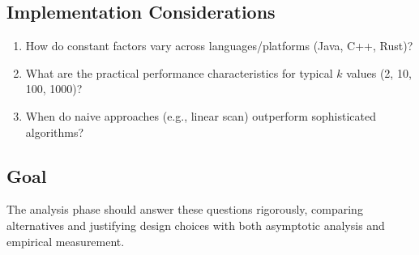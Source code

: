 \documentclass[11pt]{article}
\begin{document}
\subsection{Implementation Considerations}

\begin{enumerate}
    \item How do constant factors vary across languages/platforms (Java, C++, Rust)?
    \item What are the practical performance characteristics for typical $k$ values (2, 10, 100, 1000)?
    \item When do naive approaches (e.g., linear scan) outperform sophisticated algorithms?
\end{enumerate}

\subsection{Goal}

The analysis phase should answer these questions rigorously, comparing alternatives and justifying design choices with both asymptotic analysis and empirical measurement.
\end{document}
